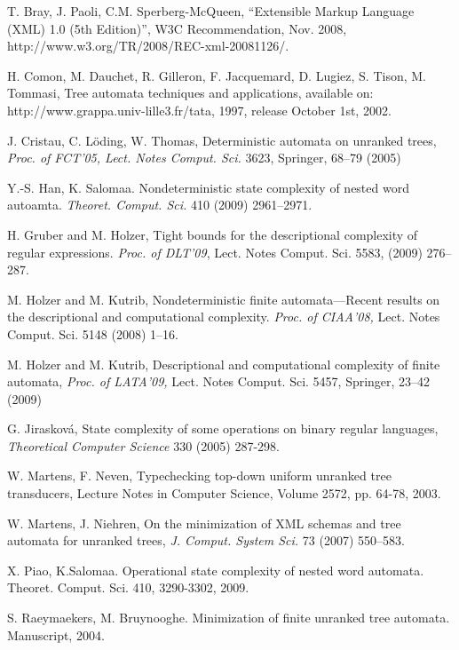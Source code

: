 \documentclass[copyright]{eptcs}
\begin{document}
\begin{thebibliography}{99}

{\small

T. Bray, J. Paoli, C.M. Sperberg-McQueen, ``Extensible Markup
Language (XML) 1.0 (5th Edition)'', W3C Recommendation, Nov. 2008,
http://www.w3.org/TR/2008/REC-xml-20081126/.


H. Comon, M. Dauchet, R. Gilleron, F. Jacquemard, D. Lugiez, S.
Tison, M. Tommasi, Tree automata techniques and applications,
available on: http://www.grappa.univ-lille3.fr/tata, 1997, release
October 1st, 2002.

  J. Cristau, C. L\"oding, W. Thomas,
Deterministic automata on unranked trees, {\em Proc. of FCT'05,
Lect. Notes Comput. Sci. } 3623, Springer, 68--79 (2005)

 Y.-S. Han, K. Salomaa. Nondeterministic state
complexity of nested word autoamta.
{\em Theoret. Comput. Sci.} 410 (2009) 2961--2971.

 H. Gruber and M. Holzer,
Tight bounds for the descriptional complexity of regular
expressions. {\em Proc. of DLT'09}, Lect. Notes Comput.
Sci. 5583, (2009) 276--287.

 M. Holzer and M. Kutrib,
Nondeterministic finite automata---Recent results on the
descriptional and computational complexity.
{\em Proc. of CIAA'08,} Lect. Notes Comput. Sci.
5148 (2008) 1--16.

 M. Holzer and M. Kutrib,
Descriptional and computational complexity of finite automata,
{\em Proc. of LATA'09,} Lect. Notes Comput. Sci. 5457, Springer,
23--42 (2009)

 G. Jiraskov\'a,
State complexity of some operations on
binary regular languages, {\em Theoretical Computer Science\/} 330
(2005) 287-298.


W. Martens, F. Neven, Typechecking top-down uniform unranked tree
transducers, Lecture Notes in Computer Science, Volume 2572, pp.
64-78, 2003.

 W. Martens, J. Niehren, On the minimization of
XML schemas and tree automata for unranked trees, {\em J. Comput.
System Sci.} 73 (2007) 550--583.

X. Piao, K.Salomaa. Operational state complexity of nested word
automata. {\rm Theoret. Comput. Sci.} 410, 3290-3302, 2009.

 S. Raeymaekers, M. Bruynooghe.
Minimization of finite unranked tree automata. Manuscript, 2004.


}
\end{thebibliography}
\end{document}
